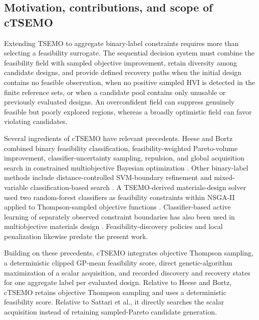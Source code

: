 \documentclass[twoside]{article}
\begin{document}
\subsection{Motivation, contributions, and scope of cTSEMO}
\label{sec:intro-contributions}

Extending TSEMO to aggregate binary-label constraints requires more than
selecting a feasibility surrogate.  The sequential decision system must
combine the feasibility field with sampled objective improvement, retain
diversity among candidate designs, and provide defined recovery paths when the initial design
contains no feasible observation, when no positive sampled HVI is detected in
the finite reference sets, or when a
candidate pool contains only unusable or previously evaluated designs.  An
overconfident field can suppress genuinely feasible but poorly explored
regions, whereas a broadly optimistic field can favor violating candidates.

Several ingredients of cTSEMO have relevant precedents. Heese and Bortz
combined binary feasibility classification, feasibility-weighted
Pareto-volume improvement, classifier-uncertainty sampling, repulsion, and
global acquisition search in constrained multiobjective Bayesian optimization
\cite{heese2021binary}. Other binary-label methods include
distance-controlled SVM-boundary refinement \cite{basudhar2012svm} and
mixed-variable classification-based search \cite{nardi2019hypermapper}. A
TSEMO-derived materials-design solver used two random-forest classifiers as
feasibility constraints within NSGA-II applied to Thompson-sampled objective
functions \cite{sattari2024physics}. Classifier-based active learning of
separately observed constraint boundaries has also been used in multiobjective
materials design
\cite{khatamsaz2022materials,khatamsaz2023entropy}. Feasibility-discovery policies
\cite{gelbart2014unknown,feliot2017constrained} and local penalization
\cite{gonzalez2016localpenalization} likewise predate the present work.

Building on these precedents, cTSEMO integrates objective Thompson sampling, a
deterministic clipped GP-mean feasibility score, direct genetic-algorithm
maximization of a scalar acquisition, and recorded discovery and recovery
states for one aggregate label per evaluated design. Relative to Heese and
Bortz, cTSEMO retains objective Thompson sampling and uses a deterministic
feasibility score. Relative to Sattari et al., it directly searches the scalar
acquisition instead of retaining sampled-Pareto candidate generation.
\end{document}
